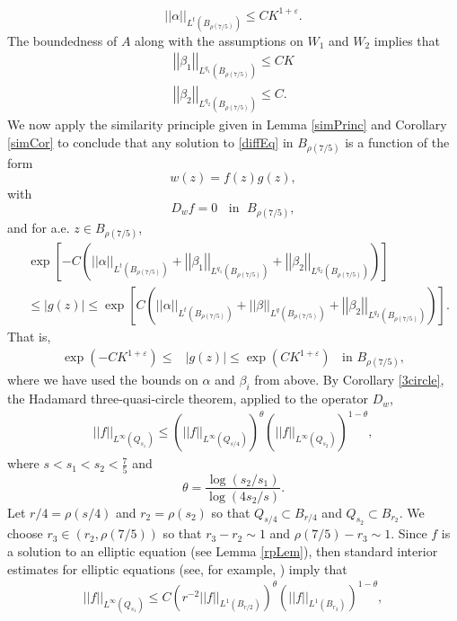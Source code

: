 \documentclass[12pt,reqno]{amsart}
\theoremstyle{plain}
\theoremstyle{definition}
\newcommand{\eps}{\varepsilon}
\newcommand{\al}{\alpha}
\newcommand{\be}{\beta}
\newcommand{\te}{\theta}
\newcommand{\iny}{\infty}
\newcommand{\su}{\subset}
\newcommand{\norm}[1]{\left\vert \left\vert #1\right\vert\right\vert}
\newcommand{\abs}[1]{\left\vert#1\right\vert}
\newcommand{\brac}[1]{\left[#1\right]}
\newcommand{\pr}[1]{\left( #1 \right) }
\begin{document}
\begin{equation*}
\norm{\al}_{L^t\pr{B_{\rho\pr{7/5}}}} \le C K^{1 + \eps}.
\end{equation*}
The boundedness of $A$ along with the assumptions on $W_1$ and $W_2$ implies that
\begin{align*}
\norm{\be_1}_{L^{q_1}\pr{B_{\rho\pr{7/5}}}} \le C K \\
\norm{\be_2}_{L^{q_2}\pr{B_{\rho\pr{7/5}}}} \le C .
\end{align*}
We now apply the similarity principle given in Lemma \ref{simPrinc} and Corollary \ref{simCor} to conclude that any solution to \eqref{diffEq} in $B_{\rho\pr{7/5}}$ is a function of the form
$$w\pr{z} = f\pr{z} g\pr{z},$$
with
$$D_w f = 0 \;\; \text{ in } \; B_{\rho\pr{7/5}},$$
and for a.e. $z \in B_{\rho\pr{7/5}}$,
\begin{align*}
&\exp\brac{-C \pr{ \norm{\al}_{L^t\pr{B_{\rho\pr{7/5}}}} +  \norm{\be_1}_{L^{q_1}\pr{B_{\rho\pr{7/5}}}}+  \norm{\be_2}_{L^{q_2}\pr{B_{\rho\pr{7/5}}}}}} \\
&\le \abs{g\pr{z}} \le \exp\brac{C \pr{ \norm{\al}_{L^t\pr{B_{\rho\pr{7/5}}}} +  \norm{\be}_{L^q\pr{B_{\rho\pr{7/5}}}}+  \norm{\be_2}_{L^{q_2}\pr{B_{\rho\pr{7/5}}}}}}.
\end{align*}
That is,
\begin{align}
\exp\pr{-C K^{1 + \eps} } \le & \abs{g\pr{z}} \le \exp\pr{C K^{1 + \eps}} \;\; \text{ in } B_{\rho\pr{7/5}},
\label{gBnd}
\end{align}
where we have used the bounds on $\al$ and $\be_i$ from above.
By Corollary \ref{3circle}, the Hadamard three-quasi-circle theorem, applied to the operator $D_w$, 
\begin{align*}
\norm{f}_{L^\iny\pr{Q_{s_1}}} \le \pr{\norm{f}_{L^\iny\pr{Q_{s/4}}}}^\te \pr{\norm{f}_{L^\iny\pr{Q_{s_2}}}}^{1 - \te},
\end{align*}
where $s < s_1 < s_2 < \frac{7}{5}$ and 
$$\te = \frac{\log\pr{s_2/s_1}}{\log\pr{4 s_2/s}}.$$
Let $r/4 = \rho\pr{s/4}$ and $r_2 = \rho\pr{s_2}$ so that $Q_{s/4} \su B_{r/4}$ and $Q_{s_2} \su B_{r_2}$.
We choose $r_3 \in \pr{r_2, \rho\pr{7/5}}$ so that $r_3-r_2 \sim 1$ and $\rho\pr{7/5} - r_3 \sim 1$.
Since $f$ is a solution to an elliptic equation (see Lemma \ref{rpLem}), then standard interior estimates for elliptic equations (see, for example, \cite[Theorem~4.1]{HL11}) imply that
\begin{align}
\norm{f}_{L^\iny\pr{Q_{s_1}}} \le C \pr{r^{-2} \norm{f}_{L^1\pr{B_{r/2}}}}^\te \pr{\norm{f}_{L^1\pr{B_{r_3}}}}^{1 - \te},
\label{threeBall}
\end{align}
\end{document}
